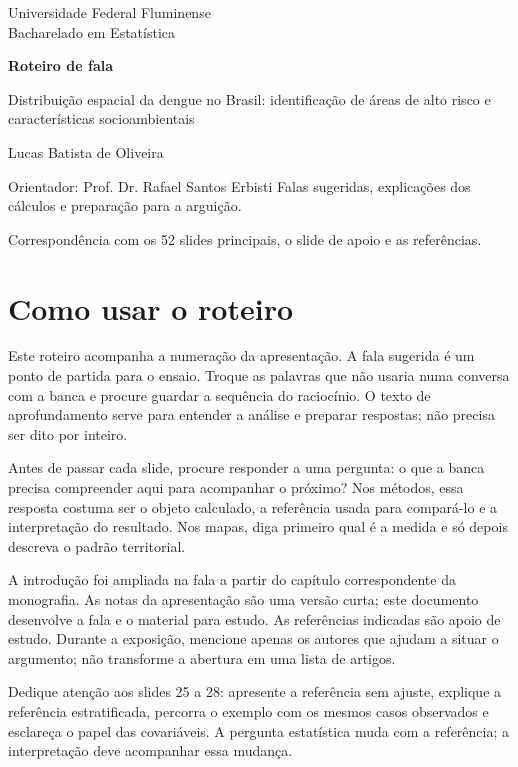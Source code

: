 \documentclass[11pt,a4paper]{article}
\begin{document}
\begin{titlepage}
\vspace*{1.0cm}
{\large Universidade Federal Fluminense\\Bacharelado em Estatística\par}
\vspace{1.3cm}
{\Huge\color{azul}\bfseries Roteiro de fala\par}
\vspace{0.4cm}{\Large Defesa de monografia\par}
\vspace{1cm}
{\Large Distribuição espacial da dengue no Brasil: identificação de áreas de alto risco e características socioambientais\par}
\vspace{1cm}
Lucas Batista de Oliveira\par
Orientador: Prof. Dr. Rafael Santos Erbisti
\vfill
Falas sugeridas, explicações dos cálculos e preparação para a arguição.\par
Correspondência com os 52 slides principais, o slide de apoio e as referências.
\end{titlepage}
{\small\setlength{\parskip}{0pt}\tableofcontents}\clearpage
\section*{Como usar o roteiro}
Este roteiro acompanha a numeração da apresentação. A fala sugerida é um ponto de partida para o ensaio. Troque as palavras que não usaria numa conversa com a banca e procure guardar a sequência do raciocínio. O texto de aprofundamento serve para entender a análise e preparar respostas; não precisa ser dito por inteiro.

Antes de passar cada slide, procure responder a uma pergunta: o que a banca precisa compreender aqui para acompanhar o próximo? Nos métodos, essa resposta costuma ser o objeto calculado, a referência usada para compará-lo e a interpretação do resultado. Nos mapas, diga primeiro qual é a medida e só depois descreva o padrão territorial.

A introdução foi ampliada na fala a partir do capítulo correspondente da monografia. As notas da apresentação são uma versão curta; este documento desenvolve a fala e o material para estudo. As referências indicadas são apoio de estudo. Durante a exposição, mencione apenas os autores que ajudam a situar o argumento; não transforme a abertura em uma lista de artigos.

Dedique atenção aos slides 25 a 28: apresente a referência sem ajuste, explique a referência estratificada, percorra o exemplo com os mesmos casos observados e esclareça o papel das covariáveis. A pergunta estatística muda com a referência; a interpretação deve acompanhar essa mudança.
\end{document}
